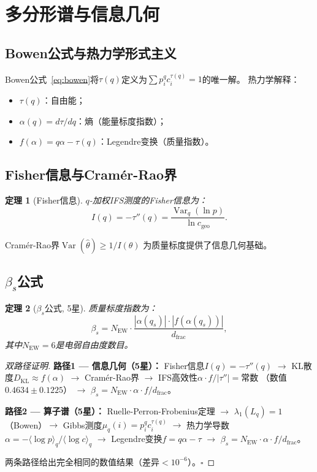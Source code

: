 \documentclass[12pt,a4paper]{ctexart}
\newtheorem{theorem}{定理}[section]
\begin{document}
\section{多分形谱与信息几何}
\label{sec:multifractal}

\subsection{Bowen公式与热力学形式主义}

Bowen公式~\eqref{eq:bowen}将$\tau(q)$定义为$\sum p_i^q c_i^{\tau(q)} = 1$的唯一解。
热力学解释：
\begin{itemize}
  \item $\tau(q)$：自由能；
  \item $\alpha(q) = d\tau/dq$：熵（能量标度指数）；
  \item $f(\alpha) = q\alpha - \tau(q)$：Legendre变换（质量指数）。
\end{itemize}

\subsection{Fisher信息与Cram\'er-Rao界}

\begin{theorem}[Fisher信息]
$q$-加权IFS测度的Fisher信息为：
\begin{equation}
I(q) = -\tau''(q) = \frac{\operatorname{Var}_q(\ln p)}{\ln c_{\text{geo}}}.
\end{equation}
\end{theorem}

Cram\'er-Rao界$\operatorname{Var}(\hat{\theta}) \ge 1/I(\theta)$
为质量标度提供了信息几何基础。

\subsection{$\beta_s$公式}

\begin{theorem}[$\beta_s$公式, 5星]
\label{thm:beta}
质量标度指数为：
\begin{equation}
\beta_s = N_{\text{EW}} \cdot \frac{|\alpha(q_s)| \cdot |f(\alpha(q_s))|}{d_{\text{frac}}},
\end{equation}
其中$N_{\text{EW}} = 6$是电弱自由度数目。
\end{theorem}

\begin{proof}[双路径证明]
\textbf{路径1 --- 信息几何（5星）：}
Fisher信息$I(q) = -\tau''(q)$ $\to$ KL散度$D_{\text{KL}} \approx f(\alpha)$
$\to$ Cram\'er-Rao界 $\to$ IFS高效性$\alpha \cdot f / |\tau''| = \text{常数}$
（数值$0.4634 \pm 0.1225$） $\to$ $\beta_s = N_{\text{EW}} \cdot \alpha \cdot f / d_{\text{frac}}$。

\textbf{路径2 --- 算子谱（5星）：}
Ruelle-Perron-Frobenius定理 $\to$ $\lambda_1(L_q) = 1$（Bowen）$\to$
Gibbs测度$\mu_q(i) = p_i^q c_i^{\tau(q)}$ $\to$ 热力学导数
$\alpha = -\langle \log p \rangle_q / \langle \log c \rangle_q$
$\to$ Legendre变换$f = q\alpha - \tau$ $\to$ $\beta_s = N_{\text{EW}} \cdot \alpha \cdot f / d_{\text{frac}}$。

两条路径给出完全相同的数值结果（差异$< 10^{-6}$）。$\square$
\end{proof}
\end{document}
